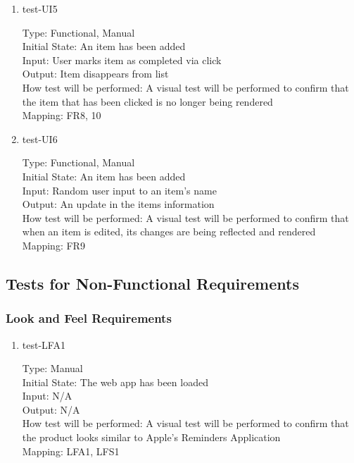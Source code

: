 \documentclass[12pt, titlepage]{article}
\begin{document}
\begin{enumerate}
\item{test-UI5\\}

Type: Functional, Manual\\
Initial State: An item has been added\\
Input: User marks item as completed via click\\
Output: Item disappears from list\\
How test will be performed: A visual test will be performed to confirm that the item that has been clicked is no longer being rendered\\
Mapping: FR8, 10

\item{test-UI6\\}

Type: Functional, Manual\\
Initial State: An item has been added\\
Input: Random user input to an item’s name\\
Output: An update in the items information\\
How test will be performed: A visual test will be performed to confirm that when an item is edited, its changes are being reflected and rendered\\
Mapping: FR9

\end{enumerate}

\subsection{Tests for Non-Functional Requirements}

\subsubsection{Look and Feel Requirements}

\begin{enumerate}
\item {test-LFA1\\}

Type: Manual\\
Initial State: The web app has been loaded\\
Input: N/A\\
Output: N/A\\
How test will be performed: A visual test will be performed to confirm that the product looks similar to Apple’s Reminders Application\\
Mapping: LFA1, LFS1

\end{enumerate}
\end{document}
